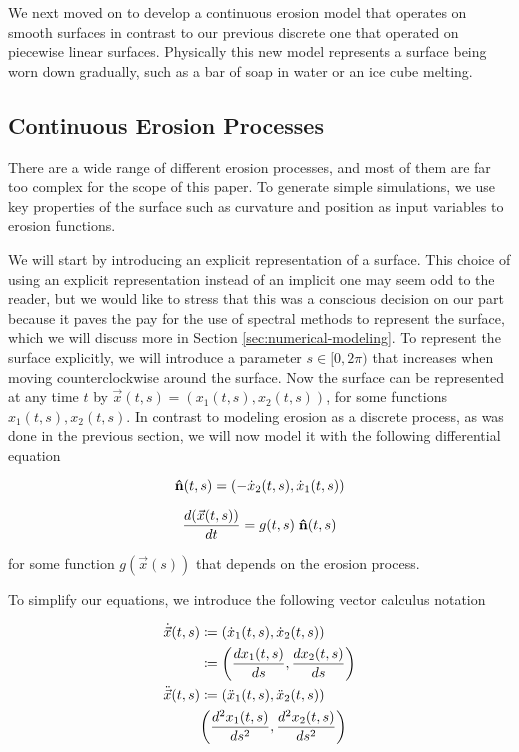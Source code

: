 
We next moved on to develop a continuous erosion model that operates on smooth surfaces in contrast to our previous discrete one that operated on piecewise linear surfaces. Physically this new model represents a surface being worn down gradually, such as a bar of soap in water or an ice cube melting. 

\subsection*{Continuous Erosion Processes}

There are a wide range of different erosion processes, and most of them are far too complex for the scope of this paper. To generate simple simulations, we use key properties of the surface such as curvature and position as input variables to erosion functions.

We will start by introducing an explicit representation of a surface. This choice of using an explicit representation instead of an implicit one may seem odd to the reader, but we would like to stress that this was a conscious decision on our part because it paves the pay for the use of spectral methods to represent the surface, which we will discuss more in Section \ref{sec:numerical-modeling}. To represent the surface explicitly, we will introduce a parameter $s \in [0, 2\pi)$ that increases when moving counterclockwise around the surface. Now the surface can be represented at any time $t$ by $\vec{x}(t, s) = (x_1(t, s), x_2(t, s))$, for some functions $x_1(t, s), x_2(t, s)$. In contrast to modeling erosion as a discrete process, as was done in the previous section, we will now model it with the following differential equation

\[
  \mathbf{\hat{n}}(t, s) = (-\dot{x}_2(t, s), \dot{x}_1(t, s))
\]

\begin{equation}
  \frac{d(\vec{x}(t, s))}{dt} = g(t, s) \; \mathbf{\hat{n}}(t, s) \label{eq:erosion-diff-eq}
\end{equation}

for some function $g(\vec{x}(s))$ that depends on the erosion process.

To simplify our equations, we introduce the following vector calculus notation

\begin{align*}
  \dot{\vec{x}}(t, s)& \coloneqq \paren{\dot{x}_1(t, s), \dot{x}_2(t, s)}\\
  & \coloneqq \paren{\frac{dx_1(t, s)}{ds}, \frac{dx_2(t, s)}{ds}}\\
  \ddot{\vec{x}}(t, s)& \coloneqq \paren{\ddot{x}_1(t, s), \ddot{x}_2(t, s)}\\
  & \paren{\frac{d^2 x_1(t, s)}{ds^2}, \frac{d^2 x_2(t, s)}{ds^2}}
\end{align*}

